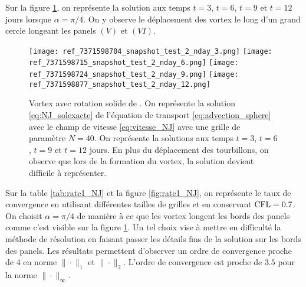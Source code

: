 Sur la figure \ref{fig:NJ_difftps}, on représente la solution aux temps $t=3$, $t=6$, $t=9$ et $t=12$ jours lorsque $\alpha = \pi/4$. On y observe le déplacement des vortex le long d'un grand cercle longeant les panels $(V)$ et $(VI)$.

\begin{figure}[htbp]
\begin{center}
\texttt{[image: ref\_7371598704\_snapshot\_test\_2\_nday\_3.png]}
\texttt{[image: ref\_7371598715\_snapshot\_test\_2\_nday\_6.png]}
\texttt{[image: ref\_7371598724\_snapshot\_test\_2\_nday\_9.png]}
\texttt{[image: ref\_7371598877\_snapshot\_test\_2\_nday\_12.png]}
\end{center}
\caption{Vortex avec rotation solide de \cite{Nair2008}. On représente la solution \eqref{eq:NJ_solexacte} de l'équation de transport \eqref{eq:advection_sphere} avec le champ de vitesse \eqref{eq:vitesse_NJ} avec une grille de paramètre $N=40$. On représente la solutions aux temps $t=3$, $t=6$, $t=9$ et $t=12$ jours. En plus du déplacement des tourbillons, on observe que lors de la formation du vortex, la solution devient difficile à représenter.}
\label{fig:NJ_difftps} 
\end{figure}

Sur la table \ref{tab:rate1_NJ} et la figure \ref{fig:rate1_NJ}, on représente le taux de convergence en utilisant différentes tailles de grilles et en conservant $\text{CFL} = 0.7$. On choisit $\alpha = \pi/4$ de manière à ce que les vortex longent les bords des panels comme c'est visible sur la figure \ref{fig:NJ_difftps}. Un tel choix vise à mettre en difficulté la méthode de résolution en faisant passer les détails fins de la solution sur les bords des panels. Les résultats permettent d'observer un ordre de convergence proche de $4$ en norme $\| \cdot \|_1$ et $\| \cdot \|_2$. L'ordre de convergence est proche de $3.5$ pour la norme $\| \cdot \|_{\infty}$. 

